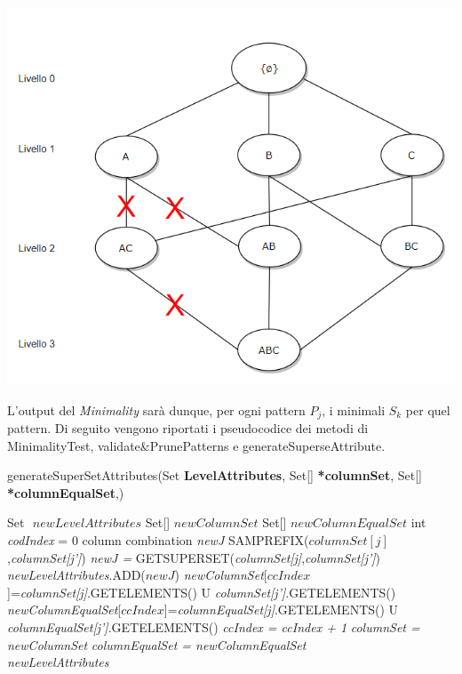\begin{center}
	\includegraphics[scale = 0.60]{Immagini/Lattice-taglio.png}\\
\end{center}
L'output del \emph{Minimality} sarà dunque, per ogni pattern $P_j$, i minimali $S_k$ per quel pattern. Di seguito vengono riportati i pseudocodice dei metodi di MinimalityTest, validate\&PrunePatterns e generateSuperseAttribute.\\
\begin{algorithm}
	\caption{generateSuperSetAttributes(Set \textbf{LevelAttributes}, Set[] \textbf{*columnSet}, Set[] \textbf{*columnEqualSet},)}\label{generatesupersetattributes}
	\begin{algorithmic}[1]	
		
		
		\State Set $\textit{ newLevelAttributes}$
		\State Set[] $\textit{newColumnSet}$
		\State Set[] $\textit{newColumnEqualSet}$
		\State int \textit{codIndex} = 0
		\State column combination \textit{newJ}
		\If SAMPREFIX($columnSet[j]$,\textit{columnSet[j']})
		\State \textit{newJ = }GETSUPERSET(\textit{columnSet[j]},\textit{columnSet[j']})
		\State \textit{newLevelAttributes}.ADD($newJ$)
		\State \textit{newColumnSet}[$ccIndex$]=\textit{columnSet[j]}.GETELEMENTS()
		\State U \textit{columnSet[j']}.GETELEMENTS()
		\State \textit{newColumnEqualSet}[$ccIndex$]=\textit{columnEqualSet[j]}.GETELEMENTS()
		\State U \textit{columnEqualSet[j']}.GETELEMENTS()
		\State \textit{ccIndex = ccIndex + 1}	    
		\EndIf
		\EndFor
		\EndFor
		\State \textit{columnSet = newColumnSet}
		\State \textit{columnEqualSet = newColumnEqualSet}\\
		\Return \textit{newLevelAttributes}
	\end{algorithmic}
\end{algorithm}
